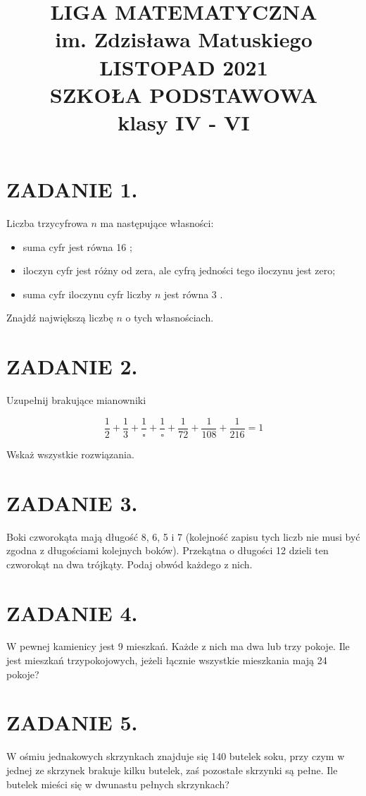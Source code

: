 \documentclass[10pt]{article}
\title{LIGA MATEMATYCZNA \\
 im. Zdzisława Matuskiego \\
 LISTOPAD 2021 \\
 SZKOŁA PODSTAWOWA \\
 klasy IV - VI }
\author{}
\date{}
\begin{document}
\maketitle
\section*{ZADANIE 1.}
Liczba trzycyfrowa \(n\) ma następujące własności:

\begin{itemize}
  \item suma cyfr jest równa 16 ;
  \item iloczyn cyfr jest różny od zera, ale cyfrą jedności tego iloczynu jest zero;
  \item suma cyfr iloczynu cyfr liczby \(n\) jest równa 3 .
\end{itemize}

Znajdź największą liczbę \(n\) o tych własnościach.

\section*{ZADANIE 2.}
Uzupełnij brakujące mianowniki

\[
\frac{1}{2}+\frac{1}{3}+\frac{1}{\square}+\frac{1}{\square}+\frac{1}{72}+\frac{1}{108}+\frac{1}{216}=1
\]

Wskaż wszystkie rozwiązania.

\section*{ZADANIE 3.}
Boki czworokąta mają długość 8, 6, 5 i 7 (kolejność zapisu tych liczb nie musi być zgodna z długościami kolejnych boków). Przekątna o długości 12 dzieli ten czworokąt na dwa trójkąty. Podaj obwód każdego z nich.

\section*{ZADANIE 4.}
W pewnej kamienicy jest 9 mieszkań. Każde z nich ma dwa lub trzy pokoje. Ile jest mieszkań trzypokojowych, jeżeli łącznie wszystkie mieszkania mają 24 pokoje?

\section*{ZADANIE 5.}
W ośmiu jednakowych skrzynkach znajduje się 140 butelek soku, przy czym w jednej ze skrzynek brakuje kilku butelek, zaś pozostałe skrzynki są pełne. Ile butelek mieści się w dwunastu pełnych skrzynkach?
\end{document}
